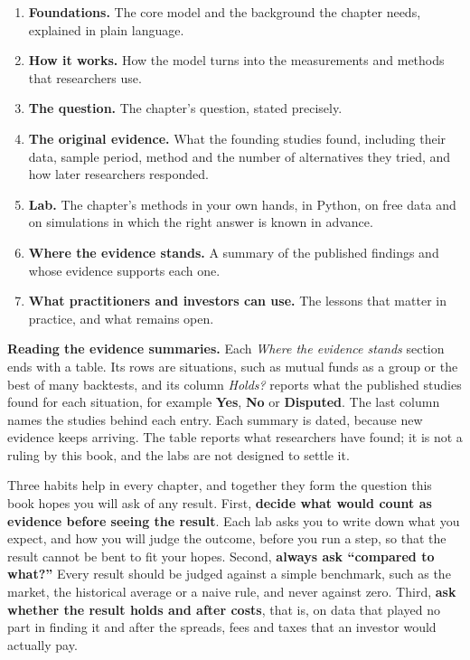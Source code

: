 \begin{enumerate}
  \item \textbf{Foundations.} The core model and the background the chapter needs, explained in plain language.
  \item \textbf{How it works.} How the model turns into the measurements and methods that researchers use.
  \item \textbf{The question.} The chapter's question, stated precisely.
  \item \textbf{The original evidence.} What the founding studies found, including their data, sample period, method and the number of alternatives they tried, and how later researchers responded.
  \item \textbf{Lab.} The chapter's methods in your own hands, in Python, on free data and on simulations in which the right answer is known in advance.
  \item \textbf{Where the evidence stands.} A summary of the published findings and whose evidence supports each one.
  \item \textbf{What practitioners and investors can use.} The lessons that matter in practice, and what remains open.
\end{enumerate}

\textbf{Reading the evidence summaries.} Each \emph{Where the evidence stands} section ends with a table. Its rows are situations, such as mutual funds as a group or the best of many backtests, and its column \emph{Holds?} reports what the published studies found for each situation, for example \textbf{Yes}, \textbf{No} or \textbf{Disputed}. The last column names the studies behind each entry. Each summary is dated, because new evidence keeps arriving. The table reports what researchers have found; it is not a ruling by this book, and the labs are not designed to settle it.

Three habits help in every chapter, and together they form the question this book hopes you will ask of any result. First, \textbf{decide what would count as evidence before seeing the result}. Each lab asks you to write down what you expect, and how you will judge the outcome, before you run a step, so that the result cannot be bent to fit your hopes. Second, \textbf{always ask ``compared to what?''} Every result should be judged against a simple benchmark, such as the market, the historical average or a naive rule, and never against zero. Third, \textbf{ask whether the result holds \label{kt:out-of-sample} and after costs}, that is, on data that played no part in finding it and after the spreads, fees and taxes that an investor would actually pay.

